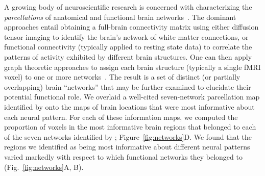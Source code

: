 \documentclass[11pt]{article}
\begin{document}
A growing body of neuroscientific research is concerned with characterizing the
\textit{parcellations} of anatomical and functional brain networks~\citep[for
review see][]{ZaleEtal10, ArslEtal18}. The dominant approaches entail obtaining
a full-brain connectivity matrix using either diffusion tensor imaging to
identify the brain's network of white matter connections, or functional
connectivity (typically applied to resting state data) to correlate the patterns
of activity exhibited by different brain structures.  One can then apply graph
theoretic approaches to assign each brain structure (typically a single fMRI
voxel) to one or more networks~\citep[for review see][]{BullSpor09}. The result
is a set of distinct (or partially overlapping) brain ``networks'' that may be
further examined to elucidate their potential functional role.  We overlaid a
well-cited seven-network parcellation map identified by \cite{YeoEtal11} onto
the maps of brain locations that were most informative about each neural
pattern.  For each of these information maps, we computed the proportion of
voxels in the most informative brain regions that belonged to each of the seven
networks identified by \cite{YeoEtal11}; Figure~\ref{fig:networks}D. We found
that the regions we identified as being most informative about different neural
patterns varied markedly with respect to which functional networks they belonged
to (Fig.~\ref{fig:networks}A, B).
\end{document}
